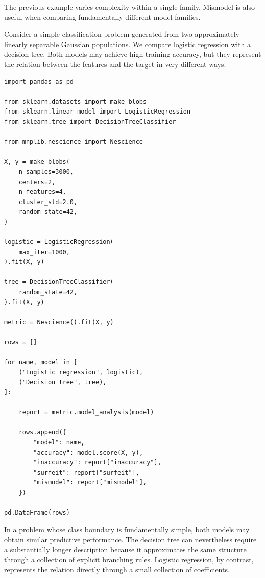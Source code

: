 The previous example varies complexity within a single family. Mismodel is
also useful when comparing fundamentally different model families.

\begin{example}
\label{ex:mismodel_model_families}

Consider a simple classification problem generated from two approximately
linearly separable Gaussian populations. We compare logistic regression with a
decision tree. Both models may achieve high training accuracy, but they
represent the relation between the features and the target in very different
ways.

\begin{sourcecode}
{\scriptsize
\begin{verbatim}
import pandas as pd

from sklearn.datasets import make_blobs
from sklearn.linear_model import LogisticRegression
from sklearn.tree import DecisionTreeClassifier

from mnplib.nescience import Nescience

X, y = make_blobs(
    n_samples=3000,
    centers=2,
    n_features=4,
    cluster_std=2.0,
    random_state=42,
)

logistic = LogisticRegression(
    max_iter=1000,
).fit(X, y)

tree = DecisionTreeClassifier(
    random_state=42,
).fit(X, y)

metric = Nescience().fit(X, y)

rows = []

for name, model in [
    ("Logistic regression", logistic),
    ("Decision tree", tree),
]:

    report = metric.model_analysis(model)

    rows.append({
        "model": name,
        "accuracy": model.score(X, y),
        "inaccuracy": report["inaccuracy"],
        "surfeit": report["surfeit"],
        "mismodel": report["mismodel"],
    })

pd.DataFrame(rows)
\end{verbatim}}
\end{sourcecode}

In a problem whose class boundary is fundamentally simple, both models may
obtain similar predictive performance. The decision tree can nevertheless
require a substantially longer description because it approximates the same
structure through a collection of explicit branching rules. Logistic regression,
by contrast, represents the relation directly through a small collection of
coefficients.


\end{example}
